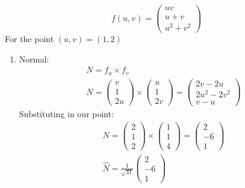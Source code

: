 \documentclass[00_complete]{subfiles}
\begin{document}
\begin{example}
    $$f(u,v)=\begin{pmatrix}
        uv \\ u + v \\ u^2 + v^2
    \end{pmatrix}$$
    For the point $(u,v) = (1,2)$
    \begin{enumerate}
        \item Normal:
            \begin{gather*}
                N=f_u \times f_v \\
                N = \begin{pmatrix}
                    v \\ 1 \\ 2u
                \end{pmatrix} \times \begin{pmatrix}
                    u \\ 1 \\ 2v
                \end{pmatrix} = \begin{pmatrix}
                    2v -2u \\ 2u^2-2v^2 \\ v-u
                \end{pmatrix}
            \end{gather*}
            Substituting in our point:
            \begin{gather*}
                N= \begin{pmatrix}
                    2\\1\\2
                \end{pmatrix} \times \begin{pmatrix}
                    1\\1\\4
                \end{pmatrix} = \begin{pmatrix}
                    2 \\-6\\1
                \end{pmatrix} \\
                \hat N = \frac{1}{\sqrt{41}}\begin{pmatrix}
                    2\\-6\\1
                \end{pmatrix}
            \end{gather*}

\end{enumerate}
\end{example}
\end{document}
